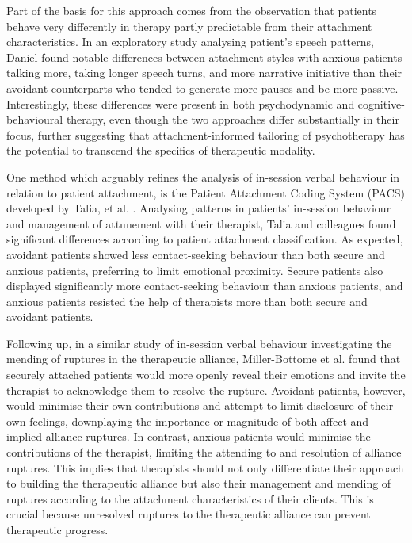 \documentclass[12pt]{report}
\begin{document}
Part of the basis for this approach comes from the observation that patients behave very differently in therapy partly predictable from their attachment characteristics.
In an exploratory study analysing patient’s speech patterns, Daniel \citeyear{Daniel2011} found notable differences between attachment styles with anxious patients talking more, taking longer speech turns, and more narrative initiative than their avoidant counterparts who tended to generate more pauses and be more passive.
Interestingly, these differences were present in both psychodynamic and cognitive-behavioural therapy, even though the two approaches differ substantially in their focus, further suggesting that attachment-informed tailoring of psychotherapy has the potential to transcend the specifics of therapeutic modality.

One method which arguably refines the analysis of in-session verbal behaviour in relation to patient attachment, is the Patient Attachment Coding System (PACS) developed by Talia, et al. \citeyear{Talia2014, Talia2017}.
Analysing patterns in patients' in-session behaviour and management of attunement with their therapist, Talia and colleagues \citeyear{Talia2014} found significant differences according to patient attachment classification.
As expected, avoidant patients showed less contact-seeking behaviour than both secure and anxious patients, preferring to limit emotional proximity.
Secure patients also displayed significantly more contact-seeking behaviour than anxious patients, and anxious patients resisted the help of therapists more than both secure and avoidant patients.

Following up, in a similar study of in-session verbal behaviour investigating the mending of ruptures in the therapeutic alliance, Miller-Bottome et al. \citeyear{MillerBottome2018} found that securely attached patients would more openly reveal their emotions and invite the therapist to acknowledge them to resolve the rupture.
Avoidant patients, however, would minimise their own contributions and attempt to limit disclosure of their own feelings, downplaying the importance or magnitude of both affect and implied alliance ruptures.
In contrast, anxious patients would minimise the contributions of the therapist, limiting the attending to and resolution of alliance ruptures.
This implies that therapists should not only differentiate their approach to building the therapeutic alliance but also their management and mending of ruptures according to the attachment characteristics of their clients.
This is crucial because unresolved ruptures to the therapeutic alliance can prevent therapeutic progress.
\end{document}
